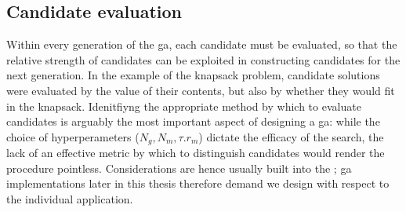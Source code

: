 \subsection{Candidate evaluation}
\label{sec:candidate_evaluation}
Within every generation of the \gls{ga}, each candidate must be evaluated, 
    so that the relative strength of candidates can be exploited in constructing 
    candidates for the next generation.
In the example of the knapsack problem, candidate solutions were evaluated by the value of their contents, 
    but also by whether they would fit in the knapsack. 
Idenitfiyng the appropriate method by which to evaluate candidates is arguably the most important aspect of designing a \gls{ga}:
    while the choice of hyperperameters ($N_g, N_m, \tau. r_m$) dictate the efficacy of the search, 
    the lack of an effective metric by which to distinguish candidates would render the procedure pointless.
Considerations are hence usually built into the ;
    \gls{ga} implementations later in this thesis therefore demand we design  
    with respect to the individual application. 
\par 




